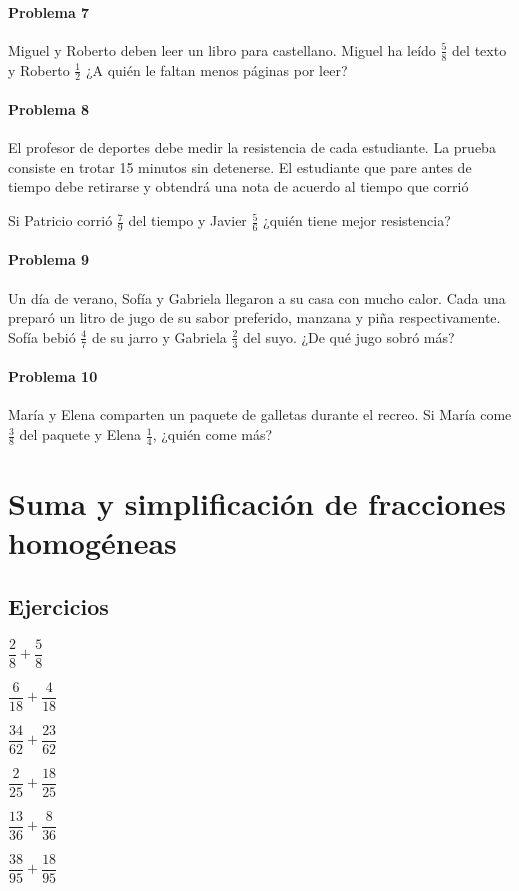 \documentclass[10pt,twoside]{article}
\begin{document}
\paragraph*{Problema 7}
Miguel y Roberto deben leer un libro para castellano. Miguel ha le\'{i}do $\frac{5}{8}$ del texto y Roberto $\frac{1}{2}$ ¿A qui\'{e}n le faltan menos p\'{a}ginas por leer?
\paragraph*{Problema 8}
El profesor de deportes debe medir la resistencia de cada estudiante. La prueba consiste en trotar 15 minutos sin detenerse. El estudiante que pare antes de tiempo debe retirarse y obtendr\'{a} una nota de acuerdo al tiempo que corri\'{o}

Si Patricio corri\'{o} $\frac{7}{9}$ del tiempo y Javier $\frac{5}{6}$ ¿qui\'{e}n tiene mejor resistencia?
\paragraph*{Problema 9}
Un d\'{i}a de verano, Sof\'{i}a y Gabriela llegaron a su casa con mucho calor. Cada una prepar\'{o} un litro de jugo de su sabor preferido, manzana y piña respectivamente. Sof\'{i}a bebi\'{o} $\frac{4}{7}$ de su jarro y Gabriela $\frac{2}{3}$ del suyo. ¿De qu\'{e} jugo sobr\'{o} m\'{a}s?
\paragraph*{Problema 10}
Mar\'{i}a y Elena comparten un paquete de galletas durante el recreo. Si Mar\'{i}a come $\frac{3}{8}$ del paquete y Elena $\frac{1}{4}$, ¿qui\'{e}n come m\'{a}s?
\section*{Suma y simplificaci\'{o}n de fracciones homog\'{e}neas}
\subsection*{Ejercicios}
\begin{enumerate}
\begin{multicols}{3}
\item $\dfrac{2}{8}+\dfrac{5}{8}$
\item $\dfrac{6}{18}+\dfrac{4}{18}$
\item $\dfrac{34}{62}+\dfrac{23}{62}$
\item $\dfrac{2}{25}+\dfrac{18}{25}$
\item $\dfrac{13}{36}+\dfrac{8}{36}$
\item $\dfrac{38}{95}+\dfrac{18}{95}$
\end{multicols}
\end{enumerate}
\end{document}
